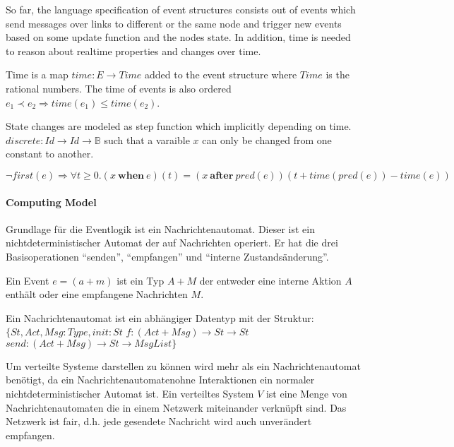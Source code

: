 So far, the language specification of event structures consists out of events
which send messages over links to different or the same node and trigger new
events based on some update function and the nodes state. In addition, time
is needed to reason about realtime properties and changes over time.~\cite{bickford2005causal}

\begin{defi}
  Time is a map $time:E\rightarrow Time$ added to the event structure where $Time$
  is the rational numbers. The time of events is also ordered $e_1\prec e_2\Rightarrow
  time(e_1)\le time(e_2)$.
\end{defi}

\begin{defi}
  State changes are modeled as step function which implicitly depending on time.
  $discrete:Id\rightarrow Id\rightarrow \mathbb{B}$ such that a varaible $x$ can only be changed
  from one constant to another.
\end{defi}

\begin{axiom}
  $\neg first(e)\Rightarrow \forall t\ge 0.(x\ \textbf{when}\ e)(t)=
  (x\ \textbf{after}\ pred(e))(t+time(pred(e))-time(e))$
\end{axiom}

\paragraph{Computing Model}

Grundlage für die Eventlogik ist ein Nachrichtenautomat. Dieser ist ein
nichtdeterministischer Automat der auf Nachrichten operiert.
Er hat die drei Basisoperationen ``senden'', ``empfangen'' und ``interne
Zustandsänderung''.~\cite{bickford2003logic}

\begin{defi}
  Ein Event $e=(a+m)$ ist ein Typ $A+M$ der entweder eine interne Aktion $A$ enthält
  oder eine empfangene Nachrichten $M$.
\end{defi}

\begin{defi}
  Ein Nachrichtenautomat ist ein abhängiger Datentyp mit der Struktur:
  $\{St, Act, Msg: Type, init: St$
    $f:(Act+Msg)\rightarrow St\rightarrow St$
    $send:(Act+Msg)\rightarrow St\rightarrow MsgList\}$
\end{defi}

Um verteilte Systeme darstellen zu können wird mehr als ein Nachrichtenautomat
benötigt, da ein Nachrichtenautomatenohne Interaktionen ein normaler
nichtdeterministischer Automat ist. Ein verteiltes System $V$ ist eine Menge von
Nachrichtenautomaten die in einem Netzwerk miteinander verknüpft sind.
Das Netzwerk ist fair, d.h. jede gesendete Nachricht wird auch unverändert
empfangen.~\cite{bickford2003logic}


